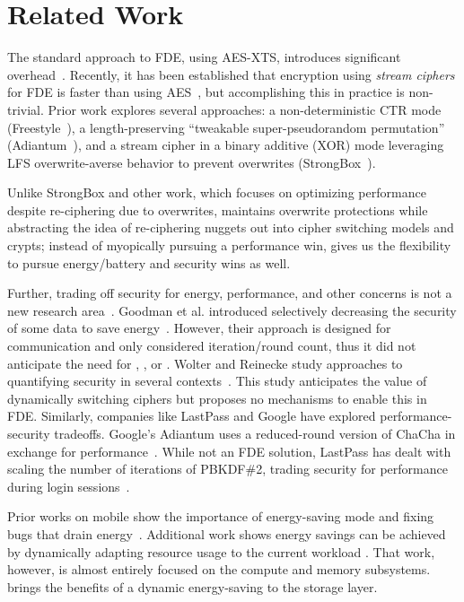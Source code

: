 \section{Related Work}\label{sec:related}


 The standard approach to FDE, using AES-XTS,
introduces significant overhead~\cite{AESItself}. Recently, it has been
established that encryption using {\em stream ciphers} for FDE is faster than
using AES~\cite{StrongBox}, but accomplishing this in practice is non-trivial.
Prior work explores several approaches: a non-deterministic CTR mode
(Freestyle~\cite{Freestyle}), a length-preserving ``tweakable super-pseudorandom
permutation'' (Adiantum~\cite{Adiantum}), and a stream cipher in a binary
additive (XOR) mode leveraging LFS overwrite-averse behavior to prevent
overwrites (StrongBox~\cite{StrongBox}).

Unlike StrongBox and other work, which focuses on optimizing performance despite
re-ciphering due to overwrites, \sys maintains overwrite protections while
abstracting the idea of re-ciphering nuggets out into cipher switching models
and crypts; instead of myopically pursuing a performance win, \sys gives us the
flexibility to pursue energy/battery and security wins as well.

 Further, trading off security for
energy, performance, and other concerns is not a new research
area~\cite{ScalableSecurity, WolterReinecke, ZengChow1, HaleemEtAl,
LiOmiecinski, Merkel4, Merkle3}. Goodman et al. introduced selectively
decreasing the security of some data to save energy~\cite{ScalableSecurity}.
However, their approach is designed for communication and only considered
iteration/round count, thus it did not anticipate the need for \sysA, \sysB, or
\sysC. Wolter and Reinecke study approaches to quantifying security in several
contexts~\cite{WolterReinecke}. This study anticipates the value of dynamically
switching ciphers but proposes no mechanisms to enable this in FDE. Similarly,
companies like LastPass and Google have explored performance-security tradeoffs.
Google's Adiantum uses a reduced-round version of ChaCha in exchange for
performance~\cite{Adiantum}. While not an FDE solution, LastPass has dealt with
scaling the number of iterations of PBKDF\#2, trading security for performance
during login sessions~\cite{LastPass}.

 Prior works on mobile show the importance
of energy-saving mode and fixing bugs that drain energy~\cite{energy-doctor,
power-aware}. Additional work shows energy savings can be achieved by
dynamically adapting resource usage to the current workload
\cite{Mishra18,Flinn99,Hoffmann15,LeSueur11}. That work, however, is almost
entirely focused on the compute and memory subsystems. \sys brings the benefits
of a dynamic energy-saving to the storage layer.
